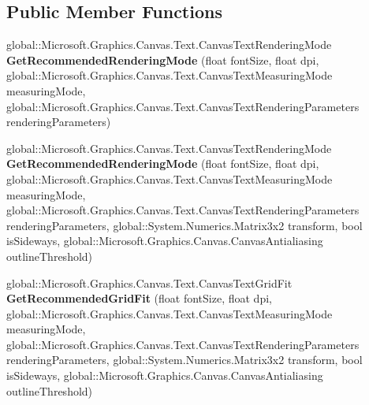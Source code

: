 \subsection*{Public Member Functions}
\begin{DoxyCompactItemize}
\item 
\mbox{\label{interface_microsoft_1_1_graphics_1_1_canvas_1_1_text_1_1_i_canvas_font_face_ae2ae5755a0eea0672afea0b62e974f44}} 
global\+::\+Microsoft.\+Graphics.\+Canvas.\+Text.\+Canvas\+Text\+Rendering\+Mode {\bfseries Get\+Recommended\+Rendering\+Mode} (float font\+Size, float dpi, global\+::\+Microsoft.\+Graphics.\+Canvas.\+Text.\+Canvas\+Text\+Measuring\+Mode measuring\+Mode, global\+::\+Microsoft.\+Graphics.\+Canvas.\+Text.\+Canvas\+Text\+Rendering\+Parameters rendering\+Parameters)
\item 
\mbox{\label{interface_microsoft_1_1_graphics_1_1_canvas_1_1_text_1_1_i_canvas_font_face_ad1b6a77bda7d882553aa0e86389e24c2}} 
global\+::\+Microsoft.\+Graphics.\+Canvas.\+Text.\+Canvas\+Text\+Rendering\+Mode {\bfseries Get\+Recommended\+Rendering\+Mode} (float font\+Size, float dpi, global\+::\+Microsoft.\+Graphics.\+Canvas.\+Text.\+Canvas\+Text\+Measuring\+Mode measuring\+Mode, global\+::\+Microsoft.\+Graphics.\+Canvas.\+Text.\+Canvas\+Text\+Rendering\+Parameters rendering\+Parameters, global\+::\+System.\+Numerics.\+Matrix3x2 transform, bool is\+Sideways, global\+::\+Microsoft.\+Graphics.\+Canvas.\+Canvas\+Antialiasing outline\+Threshold)
\item 
\mbox{\label{interface_microsoft_1_1_graphics_1_1_canvas_1_1_text_1_1_i_canvas_font_face_a700fd530e12faeab7d0ece47575bf53c}} 
global\+::\+Microsoft.\+Graphics.\+Canvas.\+Text.\+Canvas\+Text\+Grid\+Fit {\bfseries Get\+Recommended\+Grid\+Fit} (float font\+Size, float dpi, global\+::\+Microsoft.\+Graphics.\+Canvas.\+Text.\+Canvas\+Text\+Measuring\+Mode measuring\+Mode, global\+::\+Microsoft.\+Graphics.\+Canvas.\+Text.\+Canvas\+Text\+Rendering\+Parameters rendering\+Parameters, global\+::\+System.\+Numerics.\+Matrix3x2 transform, bool is\+Sideways, global\+::\+Microsoft.\+Graphics.\+Canvas.\+Canvas\+Antialiasing outline\+Threshold)
\item 
\mbox{\label{interface_microsoft_1_1_graphics_1_1_canvas_1_1_text_1_1_i_canvas_font_face_a11e8a01b93a2d69e738b14657ffc3bcd}} 

\end{DoxyCompactItemize}
